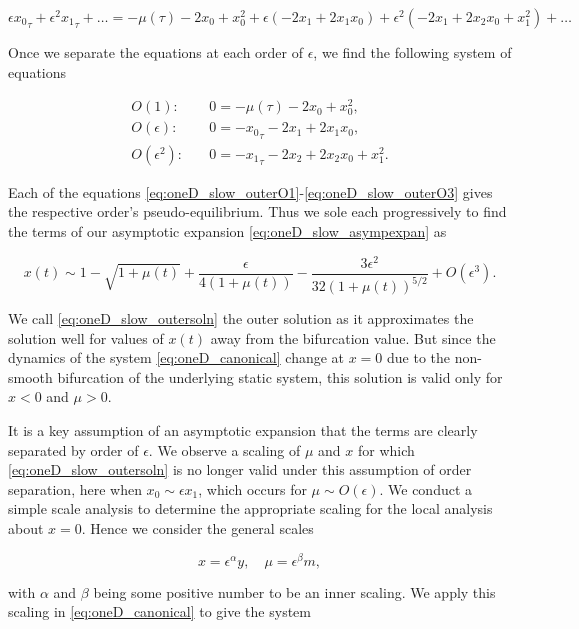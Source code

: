 \begin{equation*}
\epsilon {x_0}_\tau +\epsilon^2 {x_1}_\tau+\ldots= -\mu(\tau) -2x_0+x_0^2+\epsilon(-2x_1+2x_1x_0)+\epsilon^2(-2x_1+2x_2x_0+x_1^2)+\ldots
\end{equation*}

Once we separate the equations at each order of $\epsilon$, we find the following system of equations

\begin{align}
\label{eq:oneD_slow_outerO1}
O(1):& \quad 0=-\mu(\tau)-2x_0+x_0^2,\\
\label{eq:oneD_slow_outerO2}
O(\epsilon):& \quad 0=-{x_0}_\tau-2x_1+2x_1 x_0,\\
\label{eq:oneD_slow_outerO3}
O(\epsilon^2):& \quad 0=-{x_1}_\tau-2x_2+2x_2x_0+x_1^2.
\end{align}

Each of the equations \eqref{eq:oneD_slow_outerO1}-\eqref{eq:oneD_slow_outerO3} gives the respective order's pseudo-equilibrium. Thus we sole each progressively to find the terms of our asymptotic expansion \eqref{eq:oneD_slow_asympexpan} as

\begin{equation}\label{eq:oneD_slow_outersoln}
x(t)\sim 1-\sqrt{1+\mu(t)}+ \frac{\epsilon}{4(1+\mu(t))}-\frac{3\epsilon^2}{32(1+\mu(t))^{5/2}}+O(\epsilon^3).
\end{equation}

We call \eqref{eq:oneD_slow_outersoln} the outer solution as it approximates the solution well for values of $x(t)$ away from the bifurcation value. But since the dynamics of the system \eqref{eq:oneD_canonical} change at $x=0$ due to the non-smooth bifurcation of the underlying static system, this solution is valid only for $x<0$ and $\mu>0$.


It is a key assumption of an asymptotic expansion that the terms are clearly separated by order of $\epsilon$. We observe a scaling of $\mu$ and $x$ for which \eqref{eq:oneD_slow_outersoln} is no longer valid under this assumption of order separation, here when $x_0\sim \epsilon x_1$, which occurs for $\mu\sim O(\epsilon)$. We conduct a simple scale analysis to determine the appropriate scaling for the local analysis about $x=0$. Hence we consider the general scales

\begin{equation*}
x=\epsilon^\alpha y,\quad \mu = \epsilon^\beta m,
\end{equation*}

with $\alpha$ and $\beta$ being some positive number to be an inner scaling. We apply this scaling in \eqref{eq:oneD_canonical} to give the system

